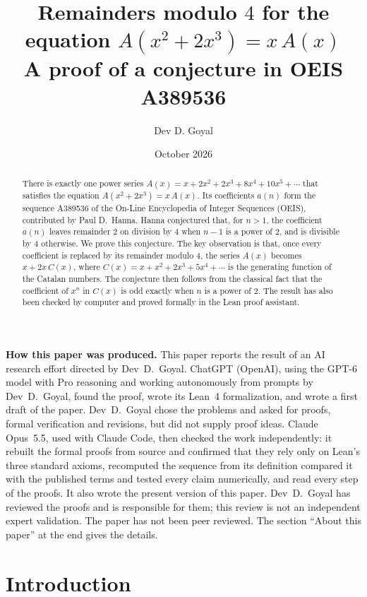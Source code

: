 \documentclass[11pt,a4paper]{article}
\title{Remainders modulo $4$ for the equation $A(x^2+2x^3)=x\,A(x)$\\[6pt]\large A proof of a conjecture in OEIS A389536}
\author{Dev D. Goyal}
\date{October 2026}
\theoremstyle{definition}
\theoremstyle{remark}
\begin{document}
\maketitle
\begin{abstract}
There is exactly one power series $A(x)=x+2x^2+2x^3+8x^4+10x^5+\cdots$ that satisfies the equation
$A(x^2+2x^3)=x\,A(x)$. Its coefficients $a(n)$ form the sequence A389536 of the On-Line Encyclopedia of Integer
Sequences (OEIS), contributed by Paul D.~Hanna. Hanna conjectured that, for $n>1$, the coefficient $a(n)$ leaves
remainder $2$ on division by $4$ when $n-1$ is a power of $2$, and is divisible by $4$ otherwise. We prove this
conjecture. The key observation is that, once every coefficient is replaced by its remainder modulo $4$, the series
$A(x)$ becomes $x+2x\,C(x)$, where $C(x)=x+x^2+2x^3+5x^4+\cdots$ is the generating function of the Catalan numbers.
The conjecture then follows from the classical fact that the coefficient of $x^n$ in $C(x)$ is odd exactly when $n$ is a power of
$2$. The result has also been checked by computer and proved formally in the Lean proof assistant.
\end{abstract}
\begin{center}\begin{minipage}{0.88\linewidth}\small
\textbf{How this paper was produced.} This paper reports the result of an AI research effort directed by
Dev~D.~Goyal. ChatGPT (OpenAI), using the GPT-6 model with Pro reasoning and working autonomously from prompts by
Dev~D.~Goyal, found the proof, wrote its Lean~4 formalization, and wrote a first draft of the paper.
Dev~D.~Goyal chose the problems and asked for proofs, formal verification and revisions, but did not supply proof
ideas. Claude Opus~5.5, used with Claude Code, then checked the work independently: it rebuilt the formal proofs from
source and confirmed that they rely only on Lean's three standard axioms, recomputed the sequence from its definition
compared it with the published terms and tested every claim numerically, and read every step of the proofs. It also wrote the present
version of this paper.
Dev~D.~Goyal has reviewed the proofs and is responsible for them; this review is not an independent expert validation.
The paper has not been peer reviewed.
The section ``About this paper'' at the end gives the details.
\end{minipage}\end{center}

\section{Introduction}
\end{document}
